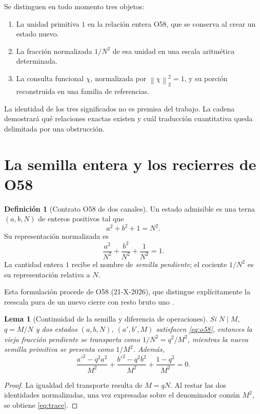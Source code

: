 \documentclass[11pt,a4paper]{article}
\theoremstyle{mine}
\newtheorem{lema}[teorema]{Lema}
\theoremstyle{definition}
\newtheorem{definicion}[teorema]{Definición}
\newcommand{\norm}[1]{\left\lVert#1\right\rVert}
\begin{document}
Se distinguen en todo momento tres objetos:
\begin{enumerate}
\item La unidad primitiva $1$ en la relación entera O58, que se conserva al crear un estado nuevo.
\item La fracción normalizada $1/N^2$ de esa unidad en una escala aritmética determinada.
\item La consulta funcional $\chi$, normalizada por $\norm\chi_2^2=1$, y su porción reconstruida en una familia de referencias.
\end{enumerate}

La identidad de los tres significados no es premisa del trabajo. La cadena demostrará qué relaciones exactas existen y cuál traducción cuantitativa queda delimitada por una obstrucción.

\section{La semilla entera y los recierres de O58}

\begin{definicion}[Contrato O58 de dos canales]
Un estado admisible es una terna $(a,b,N)$ de enteros positivos tal que
\begin{equation}\label{eq:o58}
  a^2+b^2+1=N^2.
\end{equation}
Su representación normalizada es
\begin{equation}\label{eq:o58norm}
\frac{a^2}{N^2}+\frac{b^2}{N^2}+\frac1{N^2}=1.
\end{equation}
La cantidad entera $1$ recibe el nombre de \emph{semilla pendiente}; el cociente $1/N^2$ es su representación relativa a $N$.
\end{definicion}

Esta formulación procede de O58 (21-X-2026), que distingue explícitamente la reescala pura de un nuevo cierre con resto bruto uno \cite{O58}.

\begin{lema}[Continuidad de la semilla y diferencia de operaciones]\label{le:transport}
Si $N\mid M$, $q=M/N$ y dos estados $(a,b,N)$, $(a',b',M)$ satisfacen \eqref{eq:o58}, entonces la vieja fracción pendiente se transporta como $1/N^2=q^2/M^2$, mientras la nueva semilla primitiva se presenta como $1/M^2$. Además,
\begin{equation}\label{eq:trace}
\frac{a'^2-q^2a^2}{M^2}+\frac{b'^2-q^2b^2}{M^2}+\frac{1-q^2}{M^2}=0.
\end{equation}
\end{lema}
\begin{proof}
La igualdad del transporte resulta de $M=qN$. Al restar las dos identidades normalizadas, una vez expresadas sobre el denominador común $M^2$, se obtiene \eqref{eq:trace}.
\end{proof}
\end{document}
